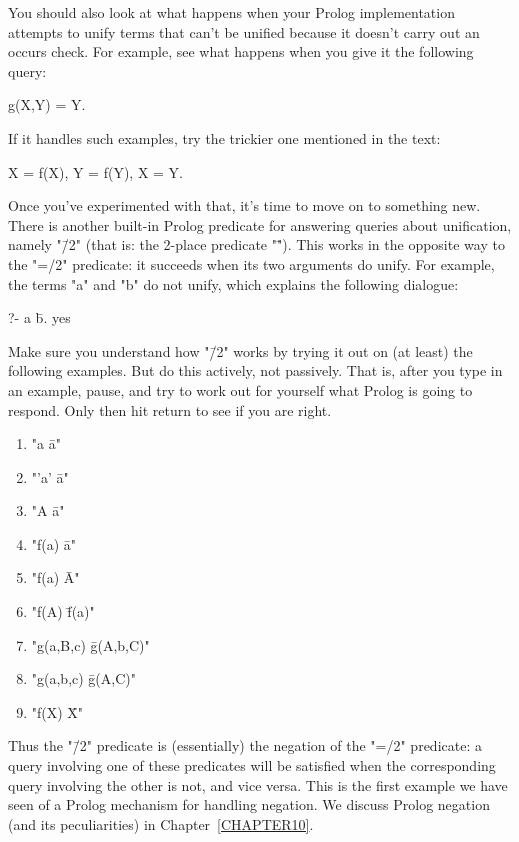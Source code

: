 You should also look at what happens when your Prolog implementation
attempts to unify terms that can't be unified because it doesn't carry
out an occurs check. For example, see what happens when you give it
the following query:
\begin{LPNcodedisplay}
g(X,Y) = Y.
\end{LPNcodedisplay}
If it handles such examples, try the trickier one mentioned in the
text:
\begin{LPNcodedisplay}
X = f(X), Y = f(Y), X = Y.
\end{LPNcodedisplay}

Once you've experimented with that, it's time to move on to something
new.  There is another built-in Prolog predicate for
answering queries about unification, namely "\=/2" (that is: the
2-place predicate "\=").   This works
in the opposite way to the "=/2" predicate: it succeeds when its two
arguments do  unify.  For example, the terms "a" and "b"
do not unify, which explains the following dialogue:
\begin{LPNcodedisplay}
?- a \= b.
yes
\end{LPNcodedisplay}

Make sure you understand how  "\=/2" works by trying it
out on (at least) the following examples.  But do this actively, not
passively.  That is, after you type in an example, pause, and try to
work out for yourself what Prolog is going to respond. Only then hit
return to see if you are right.
\begin{enumerate}
\item{}"a \= a"
\item{}"'a' \= a"
\item{}"A \= a"
\item{}"f(a) \= a"
\item{}"f(a) \= A"
\item{}"f(A) \= f(a)"
\item{}"g(a,B,c) \= g(A,b,C)"
\item{}"g(a,b,c) \= g(A,C)"
\item{}"f(X) \= X"
\end{enumerate}

Thus the "\=/2" predicate is (essentially) the negation of
the "=/2" predicate: a query involving one of these predicates will be
satisfied when the corresponding query involving the other is not, and
vice versa. This is the first example we have seen of a Prolog
mechanism for handling negation.  We discuss Prolog negation (and its
peculiarities) in Chapter~\ref{CHAPTER10}.

